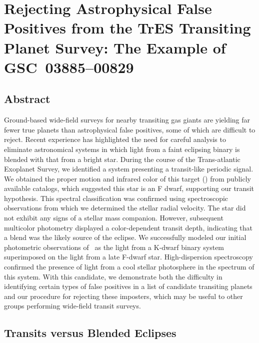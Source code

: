 \chapter[Rejecting Astrophysical False Positives from the TrES Transiting Planet Survey: The Example of \mbox{GSC 03885--00829}]{Rejecting Astrophysical False Positives from the TrES Transiting Planet Survey: The Example of \mbox{GSC 03885--00829}%
\protect\CFNA%
}\label{cha:gsc}

\section*{Abstract}\label{cha:gsc:sec:abs}

  Ground-based wide-field surveys for nearby transiting gas giants
  are yielding far fewer true planets than astrophysical false
  positives, some of which are difficult to reject. Recent experience
  has highlighted the need for careful analysis to eliminate
  astronomical systems in which light from a faint eclipsing binary is
  blended with that from a bright star. During the course of the
  Trans-atlantic Exoplanet Survey, we identified a system presenting
  a transit-like periodic signal. We obtained the proper motion and
  infrared color of this target (\gscOTE) from publicly available
  catalogs, which suggested this star is an F dwarf, supporting our
  transit hypothesis.  This spectral classification was confirmed
  using spectroscopic observations from which we determined the
  stellar radial velocity. The star did not exhibit any signs of a
  stellar mass companion. However, subsequent multicolor photometry
  displayed a color-dependent transit depth, indicating that a blend
  was the likely source of the eclipse. We successfully modeled our
  initial photometric observations of \gscOTE\ as the light from a K-dwarf binary system superimposed on the light from a late F-dwarf
  star. High-dispersion spectroscopy confirmed the presence of light
  from a cool stellar photosphere in the spectrum of this system. With
  this candidate, we demonstrate both the difficulty in identifying
  certain types of false positives in a list of candidate transiting
  planets and our procedure for rejecting these imposters, which may
  be useful to other groups performing wide-field transit surveys.

\section{Transits versus Blended Eclipses}\label{cha:gsc:sec:intro}

